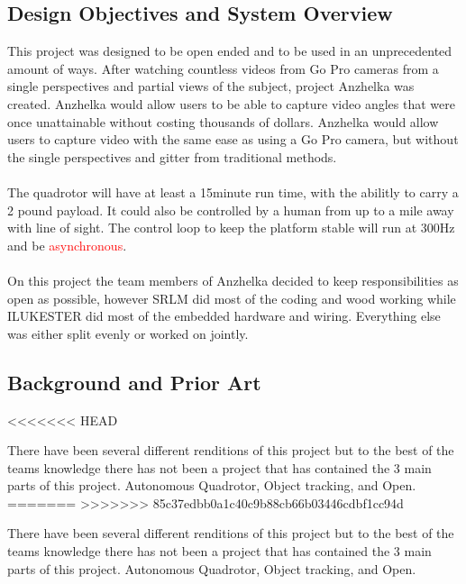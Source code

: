 \documentclass{article}
\numberwithin{equation}{section} %
\begin{document}
\subsection{Design Objectives and System Overview}

This project was designed to be open ended and to be used in an unprecedented amount of ways. After watching countless videos from Go Pro cameras from a single perspectives and partial views of the subject, project Anzhelka was created. Anzhelka would allow users to be able to capture video angles that were once unattainable without costing thousands of dollars. Anzhelka would allow users to capture video with the same ease as using a Go Pro camera, but without the single perspectives and gitter from traditional methods.\\ \\
The quadrotor will have at least a 15minute run time, with the abilitly to carry a 2 pound payload. It could also be controlled by a human from up to a mile away with line of sight. The control loop to keep the platform stable will run at 300Hz and be \textcolor{red}{asynchronous}. \\ \\
On this project the team members of Anzhelka decided to keep responsibilities as open as possible, however SRLM did most of the coding and wood working while ILUKESTER did most of the embedded hardware and wiring. Everything else was either split evenly or worked on jointly.

\subsection{Background and Prior Art}
<<<<<<< HEAD

There have been several different renditions of this project but to the best of the teams knowledge there has not been a project that has contained the 3 main parts of this project. Autonomous Quadrotor, Object tracking, and Open.
=======
>>>>>>> 85c37edbb0a1c40c9b88cb66b03446cdbf1cc94d

There have been several different renditions of this project but to the best of the teams knowledge there has not been a project that has contained the 3 main parts of this project. Autonomous Quadrotor, Object tracking, and Open.
\end{document}

